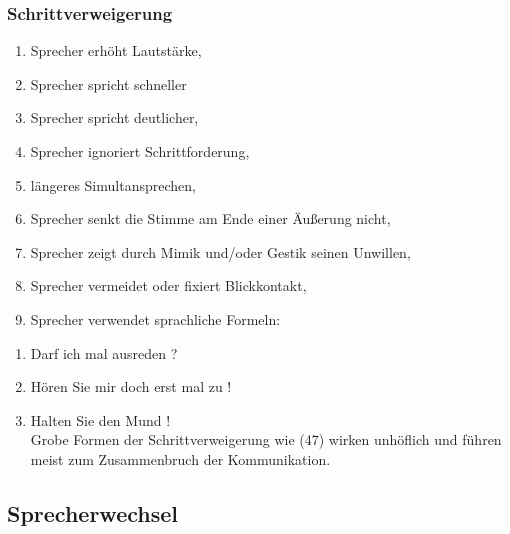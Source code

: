 \documentclass[
  letterpaper,
]{scrbook}
\providecommand{\tightlist}{%
  \setlength{\itemsep}{0pt}\setlength{\parskip}{0pt}}\usepackage{longtable,booktabs,array}
\begin{document}
\hypertarget{schrittverweigerung}{%
\subsubsection{Schrittverweigerung}\label{schrittverweigerung}}

\begin{enumerate}
\def\labelenumi{\alph{enumi})}
\tightlist
\item
  Sprecher erhöht Lautstärke,\\
\item
  Sprecher spricht schneller\\
\item
  Sprecher spricht deutlicher,\\
\item
  Sprecher ignoriert Schrittforderung,\\
\item
  längeres Simultansprechen,\\
\item
  Sprecher senkt die Stimme am Ende einer Äußerung nicht,\\
\item
  Sprecher zeigt durch Mimik und/oder Gestik seinen Unwillen,\\
\item
  Sprecher vermeidet oder fixiert Blickkontakt,\\
\item
  Sprecher verwendet sprachliche Formeln:\\
\end{enumerate}

\begin{enumerate}
\def\labelenumi{(\arabic{enumi})}
\setcounter{enumi}{44}
\tightlist
\item
  Darf ich mal ausreden ?\\
\item
  Hören Sie mir doch erst mal zu !\\
\item
  Halten Sie den Mund !\\
  Grobe Formen der Schrittverweigerung wie (47) wirken unhöflich und
  führen meist zum Zusammenbruch der Kommunikation.\\
\end{enumerate}

\hypertarget{sprecherwechsel}{%
\subsection{Sprecherwechsel}\label{sprecherwechsel}}
\end{document}
